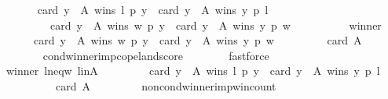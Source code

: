 \begin{isabellebody}
\ \ \isamarkupfalse%
\isanewline
\ \ \ \ {\isachardoublequoteopen}card\ {\isacharbraceleft}{\kern0pt}y\ {\isasymin}\ A{\isachardot}{\kern0pt}\ wins\ l\ p\ y{\isacharbraceright}{\kern0pt}\ {\isacharminus}{\kern0pt}\ card\ {\isacharbraceleft}{\kern0pt}y\ {\isasymin}\ A{\isachardot}{\kern0pt}\ wins\ y\ p\ l{\isacharbraceright}{\kern0pt}\isanewline
\ \ \ \ \ \ \ \ {\isacharless}{\kern0pt}\ card\ {\isacharbraceleft}{\kern0pt}y\ {\isasymin}\ A{\isachardot}{\kern0pt}\ wins\ w\ p\ y{\isacharbraceright}{\kern0pt}\ {\isacharminus}{\kern0pt}\ card\ {\isacharbraceleft}{\kern0pt}y\ {\isasymin}\ A{\isachardot}{\kern0pt}\ wins\ y\ p\ w{\isacharbraceright}{\kern0pt}{\isachardoublequoteclose}\isanewline
\ \ \isamarkupfalse%
\ {\isacharminus}{\kern0pt}\isanewline
\ \ \ \ \isamarkupfalse%
\ winner\ \isamarkupfalse%
\ {}{\isacharcolon}{\kern0pt}\isanewline
\ \ \ \ \ \ {\isachardoublequoteopen}card\ {\isacharbraceleft}{\kern0pt}y\ {\isasymin}\ A{\isachardot}{\kern0pt}\ wins\ w\ p\ y{\isacharbraceright}{\kern0pt}\ {\isacharminus}{\kern0pt}\ card\ {\isacharbraceleft}{\kern0pt}y\ {\isasymin}\ A{\isachardot}{\kern0pt}\ wins\ y\ p\ w{\isacharbraceright}{\kern0pt}\ {\isacharequal}{\kern0pt}\isanewline
\ \ \ \ \ \ \ \ card\ A\ {\isacharminus}{\kern0pt}{}{\isachardoublequoteclose}\isanewline
\ \ \ \ \ \ \isamarkupfalse%
\ cond{\isacharunderscore}{\kern0pt}winner{\isacharunderscore}{\kern0pt}imp{\isacharunderscore}{\kern0pt}copeland{\isacharunderscore}{\kern0pt}score\isanewline
\ \ \ \ \ \ \isamarkupfalse%
\ fastforce\isanewline
\ \ \ \ \isamarkupfalse%
\ winner\ l{\isacharunderscore}{\kern0pt}neq{\isacharunderscore}{\kern0pt}w\ l{\isacharunderscore}{\kern0pt}in{\isacharunderscore}{\kern0pt}A\ \isamarkupfalse%
\ {}{\isacharcolon}{\kern0pt}\isanewline
\ \ \ \ \ \ {\isachardoublequoteopen}card\ {\isacharbraceleft}{\kern0pt}y\ {\isasymin}\ A{\isachardot}{\kern0pt}\ wins\ l\ p\ y{\isacharbraceright}{\kern0pt}\ {\isacharminus}{\kern0pt}\ card\ {\isacharbraceleft}{\kern0pt}y\ {\isasymin}\ A{\isachardot}{\kern0pt}\ wins\ y\ p\ l{\isacharbraceright}{\kern0pt}\ {\isasymle}\isanewline
\ \ \ \ \ \ \ \ \ \ card\ A\ {\isacharminus}{\kern0pt}{}{\isachardoublequoteclose}\isanewline
\ \ \ \ \ \ \isamarkupfalse%
\ non{\isacharunderscore}{\kern0pt}cond{\isacharunderscore}{\kern0pt}winner{\isacharunderscore}{\kern0pt}imp{\isacharunderscore}{\kern0pt}win{\isacharunderscore}{\kern0pt}count\isanewline
\ \ \ \ \ \ \isamarkupfalse%

\end{isabellebody}
